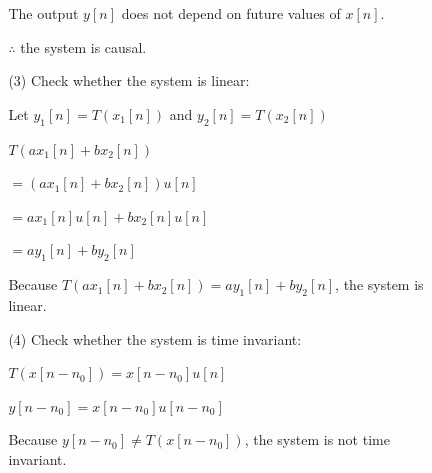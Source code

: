 \documentclass[fleqn]{article}
\begin{document}
\begin{enumerate}[nolistsep]
\begin{enumerate}[nolistsep]
\begin{enumerate}[nolistsep]
					The output $y[n]$ does not depend on future values of $x[n]$.
					
					$\therefore$ the system is causal.
					
					\item[(3)] Check whether the system is linear:
					
					Let $y_1[n] = T(x_1[n])$ and $y_2[n] = T(x_2[n])$
					
					$T(ax_1[n] + bx_2[n])$
					
					$ = (ax_1[n] + bx_2[n])u[n]$
					
					$ = ax_1[n]u[n] + bx_2[n]u[n]$
					
					$ = ay_1[n] + by_2[n]$
					
					Because $T(ax_1[n] + bx_2[n]) = ay_1[n] + by_2[n]$, the system is linear.
					
					\item[(4)] Check whether the system is time invariant:
					
					$T(x[n-n_0]) = x[n-n_0]u[n]$
					
					$y[n-n_0] = x[n-n_0]u[n-n_0]$
					
					Because $y[n-n_0] \neq T(x[n-n_0])$, the system is not time invariant.
				\end{enumerate}
			
			
			
		\end{enumerate}
		
	\end{enumerate}
\end{document}
